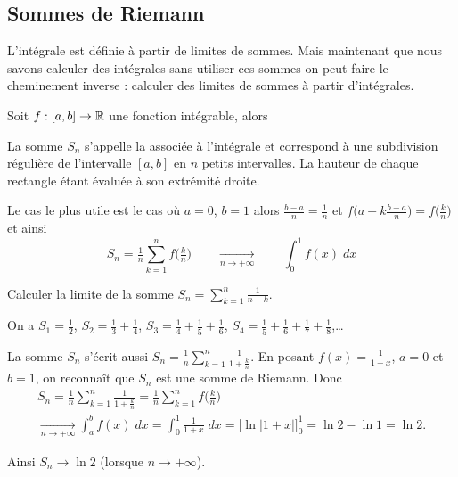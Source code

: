 \documentclass[class=report,crop=false]{standalone}
\begin{document}
\subsection{Sommes de Riemann}

L'intégrale est définie à partir de limites de sommes.
Mais maintenant que nous savons calculer des intégrales sans utiliser ces sommes
on peut faire le cheminement inverse : calculer des limites de sommes à partir d'intégrales.


\begin{theoreme}
Soit $f : [a,b] \to \mathbb{R}$ une fonction intégrable, alors 
\end{theoreme}

La somme $S_n$ s'appelle la  associée à l'intégrale et correspond à une subdivision régulière
de l'intervalle $[a,b]$ en $n$ petits intervalles. La hauteur de chaque rectangle
étant évaluée à son extrémité droite.

Le cas le plus utile est le cas où $a=0$, $b=1$ alors $\frac{b-a}{n}=\frac1n$ et
$f\big(a+k\frac{b-a}{n}\big) = f\big(\frac kn\big)$ et ainsi
$$S_n = \tfrac{1}{n} \sum_{k=1}^{n} f\big(\tfrac kn \big)
\qquad \xrightarrow[n\to+\infty]{} \qquad \int_0^1 f(x) \; dx$$


\begin{exemple}
Calculer la limite de la somme $S_n= \sum_{k=1}^{n} \frac1{n+k}$.

On a $S_1=\frac12$, $S_2=\frac13+\frac14$, $S_3=\frac14+\frac15+\frac16$,
$S_4=\frac15+\frac16+\frac17+\frac18$,\ldots

La somme $S_n$ s'écrit aussi $S_n = \frac{1}{n}  \sum_{k=1}^{n} \frac1{1+\frac kn}$.
En posant $f(x)=\frac{1}{1+x}$, $a=0$ et $b=1$,
on reconnaît que $S_n$ est une somme de Riemann.
Donc
\begin{multline*}
S_n=\frac{1}{n} \sum_{k=1}^{n} \frac1{1+\frac kn}=\frac{1}{n} \sum_{k=1}^{n} f\big(\tfrac kn\big)\\
\xrightarrow[n\to+\infty]{} \int_a^b f(x) \; dx = \int_0^1 \frac{1}{1+x} \; dx
=\big[\ln|1+x|\big]_0^1 = \ln 2-\ln 1 = \ln 2.
\end{multline*}

Ainsi $S_n \to \ln 2$ (lorsque $n\to +\infty$).
\end{exemple}
\end{document}

